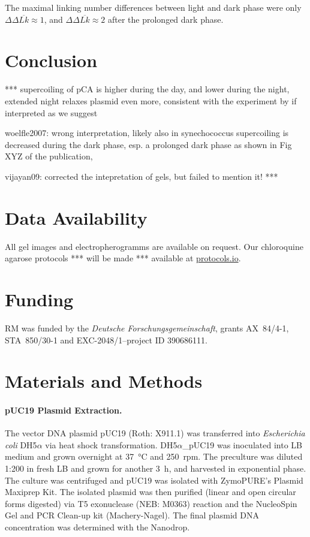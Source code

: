 \documentclass[10pt,a4]{article}
\def\cite#1{\hypersetup{citecolor=Teal}\citep{#1}} %
\newcommand{\TODO}[1]{\begingroup\color{red}*** #1 ***\endgroup}
\begin{document}
The maximal linking number differences between light and dark phase
were only $\Delta \Delta \overline{Lk} \approx 1$, and $\Delta \Delta
\overline{Lk} \approx 2$ after the prolonged dark phase.


\section{Conclusion}

\TODO{
supercoiling of pCA is higher during the day, and lower during the
night, extended night relaxes plasmid even more, consistent
with the experiment by \cite{Woelfle2007} if interpreted
as we suggest

woelfle2007: wrong interpretation, likely also in synechococcus
supercoiling is decreased during the dark phase, esp. a prolonged
dark phase as shown in Fig XYZ of the publication,


vijayan09: corrected the intepretation of gels, but failed to mention
it!
}

\section*{Data Availability}
All gel images and electropherogramms are available on request. Our
chloroquine agarose protocols \TODO{will be made} available at
\url{protocols.io}.

\section*{Funding}
RM was funded by the \textit{Deutsche Forschungsgemeinschaft}, grants
AX~84/4-1, STA~850/30-1 and EXC-2048/1--project ID 390686111. 


\section{Materials and Methods}

\paragraph{pUC19 Plasmid Extraction.}
The vector DNA plasmid pUC19 (Roth: X911.1) was transferred into
\textit{Escherichia coli} DH5$\alpha$ via heat shock
transformation. DH5$\alpha$\_pUC19 was inoculated into LB medium and
grown overnight at \SI{37}{\celsius} and \SI{250}{rpm}. The preculture
was diluted 1:200 in fresh LB and grown for another \SI{3}{\hour}, and
harvested in exponential phase. The culture was centrifuged and pUC19
was isolated with ZymoPURE's Plasmid Maxiprep Kit. The isolated
plasmid was then purified (linear and open circular forms digested)
via T5 exonuclease (NEB: M0363) reaction and the NucleoSpin Gel and
PCR Clean-up kit (Machery-Nagel). The final plasmid DNA
concentration was determined with the Nanodrop.
%
\end{document}
